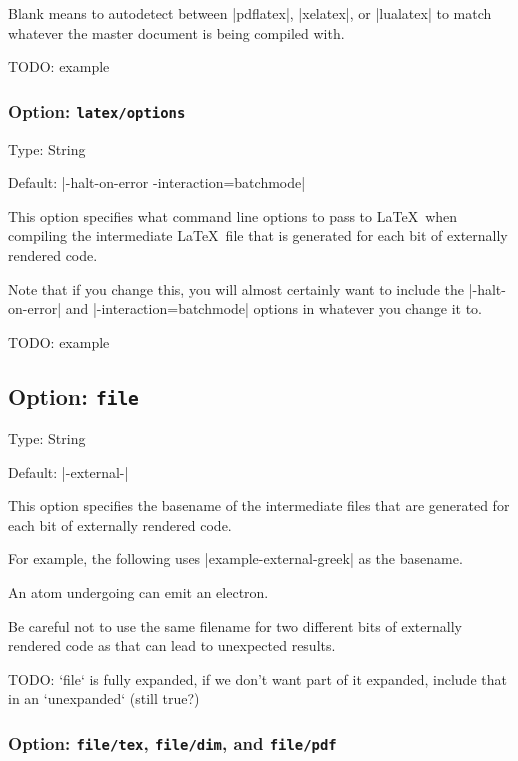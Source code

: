 \documentclass[10pt]{ltxdoc}
\newcommand{\opt}[1]{\texttt{#1}}
\begin{document}
Blank means to autodetect between |pdflatex|, |xelatex|, or |lualatex|
to match whatever the master document is being compiled with.

TODO: example

\subsubsection{Option: \opt{latex/options}}
\label{subsubsec:latex/options}

Type: String

Default: |-halt-on-error -interaction=batchmode|

This option specifies what command line options to pass to \LaTeX\ when
compiling the intermediate \LaTeX\ file that is generated for each bit
of externally rendered code.

Note that if you change this, you will almost certainly want to include
the |-halt-on-error| and |-interaction=batchmode| options in whatever
you change it to.

TODO: example

\subsection{Option: \opt{file}}
\label{subsec:file}

Type: String

Default: |\jobname-external-|

This option specifies the basename of the intermediate files that are
generated for each bit of externally rendered code.

For example, the following uses |example-external-greek| as the
basename.

\begin{tcblisting}{}
An atom undergoing
can emit an electron.
\end{tcblisting}

Be careful not to use the same filename for two different bits of
externally rendered code as that can lead to unexpected results.

TODO: `file` is fully expanded, if we don't want part of it expanded, include that in an `unexpanded` (still true?)

\subsubsection{Option: \opt{file/tex}, \opt{file/dim}, and \opt{file/pdf}}
\end{document}
